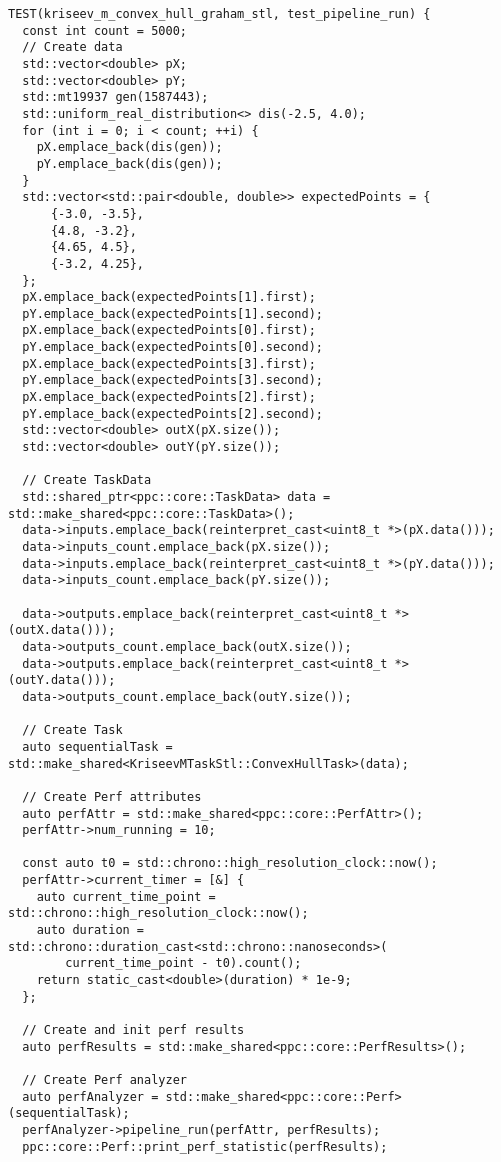 \documentclass[a4paper,12pt]{article}
\begin{document}
\begin{lstlisting}
TEST(kriseev_m_convex_hull_graham_stl, test_pipeline_run) {
  const int count = 5000;
  // Create data
  std::vector<double> pX;
  std::vector<double> pY;
  std::mt19937 gen(1587443);
  std::uniform_real_distribution<> dis(-2.5, 4.0);
  for (int i = 0; i < count; ++i) {
    pX.emplace_back(dis(gen));
    pY.emplace_back(dis(gen));
  }
  std::vector<std::pair<double, double>> expectedPoints = {
      {-3.0, -3.5},
      {4.8, -3.2},
      {4.65, 4.5},
      {-3.2, 4.25},
  };
  pX.emplace_back(expectedPoints[1].first);
  pY.emplace_back(expectedPoints[1].second);
  pX.emplace_back(expectedPoints[0].first);
  pY.emplace_back(expectedPoints[0].second);
  pX.emplace_back(expectedPoints[3].first);
  pY.emplace_back(expectedPoints[3].second);
  pX.emplace_back(expectedPoints[2].first);
  pY.emplace_back(expectedPoints[2].second);
  std::vector<double> outX(pX.size());
  std::vector<double> outY(pY.size());

  // Create TaskData
  std::shared_ptr<ppc::core::TaskData> data = std::make_shared<ppc::core::TaskData>();
  data->inputs.emplace_back(reinterpret_cast<uint8_t *>(pX.data()));
  data->inputs_count.emplace_back(pX.size());
  data->inputs.emplace_back(reinterpret_cast<uint8_t *>(pY.data()));
  data->inputs_count.emplace_back(pY.size());

  data->outputs.emplace_back(reinterpret_cast<uint8_t *>(outX.data()));
  data->outputs_count.emplace_back(outX.size());
  data->outputs.emplace_back(reinterpret_cast<uint8_t *>(outY.data()));
  data->outputs_count.emplace_back(outY.size());

  // Create Task
  auto sequentialTask = std::make_shared<KriseevMTaskStl::ConvexHullTask>(data);

  // Create Perf attributes
  auto perfAttr = std::make_shared<ppc::core::PerfAttr>();
  perfAttr->num_running = 10;

  const auto t0 = std::chrono::high_resolution_clock::now();
  perfAttr->current_timer = [&] {
    auto current_time_point = std::chrono::high_resolution_clock::now();
    auto duration = std::chrono::duration_cast<std::chrono::nanoseconds>(
        current_time_point - t0).count();
    return static_cast<double>(duration) * 1e-9;
  };

  // Create and init perf results
  auto perfResults = std::make_shared<ppc::core::PerfResults>();

  // Create Perf analyzer
  auto perfAnalyzer = std::make_shared<ppc::core::Perf>(sequentialTask);
  perfAnalyzer->pipeline_run(perfAttr, perfResults);
  ppc::core::Perf::print_perf_statistic(perfResults);


\end{lstlisting}
\end{document}
